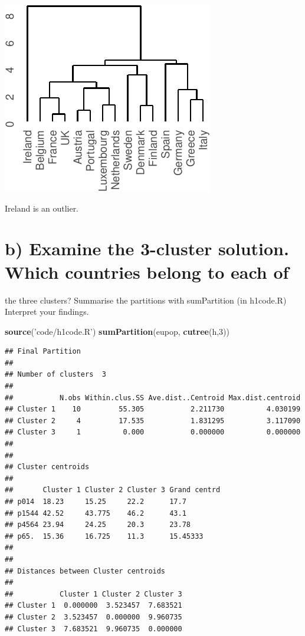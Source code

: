 \documentclass[]{article}
\newenvironment{Shaded}{\begin{snugshade}}{\end{snugshade}}
\newcommand{\DecValTok}[1]{\textcolor[rgb]{0.00,0.00,0.81}{#1}}
\newcommand{\KeywordTok}[1]{\textcolor[rgb]{0.13,0.29,0.53}{\textbf{#1}}}
\newcommand{\NormalTok}[1]{#1}
\newcommand{\StringTok}[1]{\textcolor[rgb]{0.31,0.60,0.02}{#1}}
\begin{document}
\begin{center}\includegraphics{sol_A1_files/figure-latex/unnamed-chunk-6-1} \end{center}

Ireland is an outlier.

\hypertarget{b-examine-the-3-cluster-solution.-which-countries-belong-to-each-of}{%
\section{b) Examine the 3-cluster solution. Which countries belong to
each
of}\label{b-examine-the-3-cluster-solution.-which-countries-belong-to-each-of}}

the three clusters? Summarise the partitions with sumPartition (in
h1code.R) Interpret your findings.

\begin{Shaded}
\begin{Highlighting}[]
\KeywordTok{source}\NormalTok{(}\StringTok{'code/h1code.R'}\NormalTok{)}
\KeywordTok{sumPartition}\NormalTok{(eupop, }\KeywordTok{cutree}\NormalTok{(h,}\DecValTok{3}\NormalTok{))}
\end{Highlighting}
\end{Shaded}

\begin{verbatim}
## Final Partition
## 
## Number of clusters  3
## 
##           N.obs Within.clus.SS Ave.dist..Centroid Max.dist.centroid
## Cluster 1    10         55.305           2.211730          4.030199
## Cluster 2     4         17.535           1.831295          3.117090
## Cluster 3     1          0.000           0.000000          0.000000
## 
## 
## Cluster centroids
## 
##       Cluster 1 Cluster 2 Cluster 3 Grand centrd
## p014  18.23     15.25     22.2      17.7        
## p1544 42.52     43.775    46.2      43.1        
## p4564 23.94     24.25     20.3      23.78       
## p65.  15.36     16.725    11.3      15.45333    
## 
## 
## Distances between Cluster centroids
## 
##           Cluster 1 Cluster 2 Cluster 3
## Cluster 1  0.000000  3.523457  7.683521
## Cluster 2  3.523457  0.000000  9.960735
## Cluster 3  7.683521  9.960735  0.000000
\end{verbatim}
\end{document}
